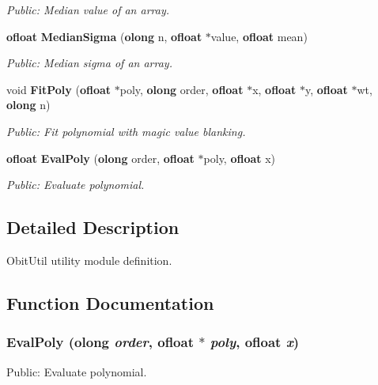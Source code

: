 \begin{CompactItemize}
\begin{CompactList}\small\item\em Public: Median value of an array. \item\end{CompactList}\item 
{\bf ofloat} {\bf Median\-Sigma} ({\bf olong} n, {\bf ofloat} $\ast$value, {\bf ofloat} mean)
\begin{CompactList}\small\item\em Public: Median sigma of an array. \item\end{CompactList}\item 
void {\bf Fit\-Poly} ({\bf ofloat} $\ast$poly, {\bf olong} order, {\bf ofloat} $\ast$x, {\bf ofloat} $\ast$y, {\bf ofloat} $\ast$wt, {\bf olong} n)
\begin{CompactList}\small\item\em Public: Fit polynomial with magic value blanking. \item\end{CompactList}\item 
{\bf ofloat} {\bf Eval\-Poly} ({\bf olong} order, {\bf ofloat} $\ast$poly, {\bf ofloat} x)
\begin{CompactList}\small\item\em Public: Evaluate polynomial. \item\end{CompactList}\end{CompactItemize}


\subsection{Detailed Description}
Obit\-Util utility module definition. 



\subsection{Function Documentation}
\subsubsection{ Eval\-Poly ({\bf olong} {\em order}, {\bf ofloat} $\ast$ {\em poly}, {\bf ofloat} {\em x})}\label{ObitUtil_8h_a7}


Public: Evaluate polynomial. 

